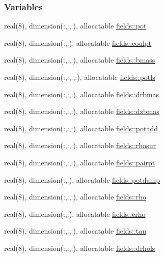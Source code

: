 \subsubsection*{Variables}
\begin{DoxyCompactItemize}
\item 
real(8), dimension(\+:,\+:,\+:), allocatable \hyperlink{namespacefields_affeca5502efb412efc5ba78c00db92e5}{fields\+::pot}
\item 
real(8), dimension(\+:,\+:), allocatable \hyperlink{namespacefields_a96dcbbbbf93ad09f4bab63bb2935ef2b}{fields\+::coulpt}
\item 
real(8), dimension(\+:,\+:,\+:), allocatable \hyperlink{namespacefields_a3c81f8fd9a140478955f8ffa81ad6e3e}{fields\+::bmass}
\item 
real(8), dimension(\+:,\+:,\+:,\+:), allocatable \hyperlink{namespacefields_a2e7e890d4b19e3340f4c0bede50db496}{fields\+::potls}
\item 
real(8), dimension(\+:,\+:,\+:), allocatable \hyperlink{namespacefields_a49978430f369b8966531d037726be271}{fields\+::drbmas}
\item 
real(8), dimension(\+:,\+:,\+:), allocatable \hyperlink{namespacefields_a08e266194feab00d01074a75a462054a}{fields\+::dzbmas}
\item 
real(8), dimension(\+:,\+:,\+:), allocatable \hyperlink{namespacefields_a732b1496899b9d685f70149d2111def7}{fields\+::potadd}
\item 
real(8), dimension(\+:,\+:,\+:), allocatable \hyperlink{namespacefields_a02acfc4f5edd5539212bd53bbb987667}{fields\+::rhosur}
\item 
real(8), dimension(\+:,\+:,\+:), allocatable \hyperlink{namespacefields_a859b2a3cc162dfed2df581140528e6f7}{fields\+::pairpt}
\item 
real(8), dimension(\+:,\+:), allocatable \hyperlink{namespacefields_a4d199294340c50de239b3153fc1d8489}{fields\+::potdamp}
\item 
real(8), dimension(\+:,\+:,\+:), allocatable \hyperlink{namespacefields_a10b593797160d6003356db31c299e2a1}{fields\+::rho}
\item 
real(8), dimension(\+:,\+:), allocatable \hyperlink{namespacefields_a0b0e5cd1c18125a1a550d87185558179}{fields\+::crho}
\item 
real(8), dimension(\+:,\+:,\+:), allocatable \hyperlink{namespacefields_a09947e9176ca8b0c02871ba5b3401b12}{fields\+::tau}
\item 
real(8), dimension(\+:,\+:,\+:), allocatable \hyperlink{namespacefields_a4bb216cb666e2cd3e39493ff2d9edc33}{fields\+::drhols}

\end{DoxyCompactItemize}
